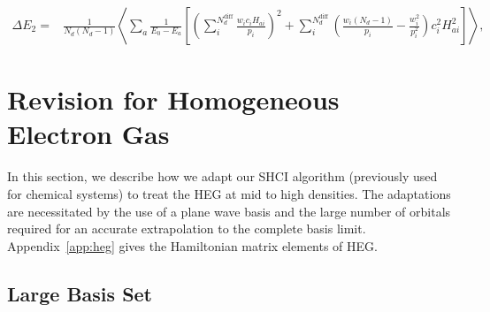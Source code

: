 \documentclass[%
reprint,
 superscriptaddress,
 amsmath,amssymb,
 aps,
]{revtex4-1}
\def\V{\mathcal{V}}
\def\Nd{{N_d}}
\def\Nddiff{{N_{d}^{\mathrm{diff}}}}
\begin{document}
\begin{widetext}
\begin{align}
\Delta E_{2}
=& \frac{1}{\Nd(\Nd-1)} \left\langle \sum_{a} \frac{1}{E_0 - E_a} \left[\left(\sum_{i}^{\Nddiff} \frac{ w_i  c_i H_{ai}}{p_i}\right)^2  +\sum_{i}^{\Nddiff} \left(\frac{w_i(\Nd-1)}{p_i } - \frac{ w_i^2}{p_i^2}\right)c_i^2 H_{ai}^2\right] \right\rangle,
\label{eq:stofinal}
\end{align}
\end{widetext}

\section{Revision for Homogeneous Electron Gas}
\label{HEG}

In this section, we describe how we adapt our SHCI algorithm (previously used for chemical systems) to treat the HEG at mid to high densities.
The adaptations are necessitated by the use of a plane wave basis and the large number of orbitals
required for an accurate extrapolation to the complete basis limit.
Appendix~\ref{app:heg} gives the Hamiltonian matrix elements of HEG.

\subsection{Large Basis Set}
\end{document}
